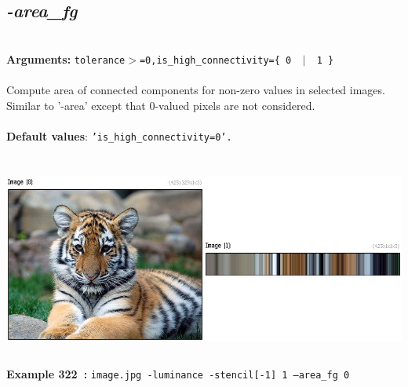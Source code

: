 \documentclass[a4paper,11pt,twoside]{book}
\begin{document}
\subsection{\emph{-area\_fg} }\vspace*{-0.5em}
~\\\textbf{Arguments: } 
{\small \texttt{tolerance$>$=0,is\_high\_connectivity=\{ 0 ~$|$~ 1 \}}}\\~\\
Compute area of connected components for non-zero values in selected images.
~\\Similar to '-area' except that 0-valued pixels are not considered.
~\\~\\\textbf{Default values}: {\small \texttt{'is\_high\_connectivity=0'.}}
\begin{center}\includegraphics[keepaspectratio=true,height=7cm,width=\textwidth]{img/gmic_def322.jpg}\\
{\footnotesize \textbf{Example 322~:} \texttt{image.jpg -luminance -stencil[-1] 1 --area\_fg 0}}
\end{center}
\end{document}
